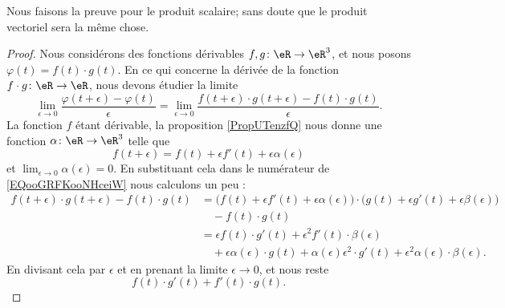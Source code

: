 Nous faisons la preuve pour le produit scalaire; sans doute que le produit vectoriel sera la même chose.
\begin{proof}
	Nous considérons des fonctions dérivables \( f,g\colon \eR\to \eR^3\), et nous posons \( \varphi(t)=f(t)\cdot g(t)\). En ce qui concerne la dérivée de la fonction \( f\cdot g\colon \eR\to \eR\), nous devons étudier la limite
	\begin{equation}        \label{EQooGRFKooNHceiW}
		\lim_{\epsilon\to 0}\frac{ \varphi(t+\epsilon)-\varphi(t) }{ \epsilon }=\lim_{\epsilon\to 0}\frac{ f(t+\epsilon)\cdot g(t+\epsilon)-f(t)\cdot g(t) }{ \epsilon }.
	\end{equation}
	La fonction \( f\) étant dérivable, la proposition \ref{PropUTenzfQ} nous donne une fonction \( \alpha\colon \eR\to \eR^3\) telle que
	\begin{equation}
		f(t+\epsilon)=f(t)+\epsilon f'(t)+\epsilon\alpha(\epsilon)
	\end{equation}
	et \( \lim_{\epsilon\to 0}\alpha(\epsilon)=0\). En substituant cela dans le numérateur de \eqref{EQooGRFKooNHceiW} nous calculons un peu :
	\begin{subequations}
		\begin{align}
			f(t+\epsilon)\cdot g(t+\epsilon)-f(t)\cdot g(t) & =\big( f(t)+\epsilon f'(t)+\epsilon \alpha(\epsilon) \big)\cdot\big( g(t)+\epsilon g'(t)+\epsilon\beta(\epsilon) \big)          \\
			                                                & \quad - f(t)\cdot g(t)                                                                                                          \\
			                                                & =\epsilon f(t)\cdot g'(t)+\epsilon^2 f'(t)\cdot \beta(\epsilon)                                                                 \\
			                                                & \quad+\epsilon\alpha(\epsilon)\cdot g(t)+\alpha(\epsilon)\epsilon^2\cdot g'(t)+\epsilon^2\alpha(\epsilon)\cdot \beta(\epsilon).
		\end{align}
	\end{subequations}
	En divisant cela par \( \epsilon\) et en prenant la limite \( \epsilon\to 0\), et nous reste
	\begin{equation}
		f(t)\cdot g'(t)+f'(t)\cdot g(t).
	\end{equation}
\end{proof}

